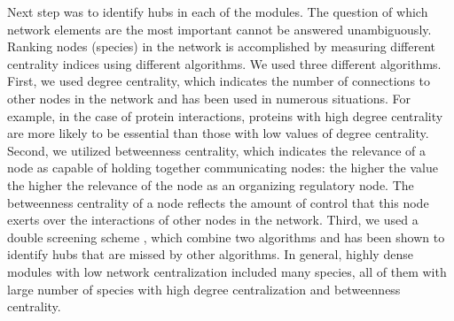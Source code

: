 Next step was to identify hubs in each of the modules. The question of which network elements are the most important cannot be answered unambiguously. Ranking nodes (species) in the network is accomplished by measuring different centrality indices using different algorithms. We used three different algorithms. First, we used degree centrality, which indicates the number of connections to other nodes in the network and has been used in numerous situations. For example, in the case of protein interactions, proteins with high degree centrality are more likely to be essential than those with low values of degree centrality. Second, we utilized betweenness centrality, which indicates the relevance of a node as capable of holding together communicating nodes: the higher the value the higher the relevance of the node as an organizing regulatory node. The betweenness centrality of a node reflects the amount of control that this node exerts over the interactions of other nodes in the network. Third, we used a double screening scheme , which combine two algorithms  and has been shown to identify hubs that are missed by other algorithms. In general, highly dense modules with low network centralization included many species, all of them with large number of species with high degree centralization and betweenness centrality.


